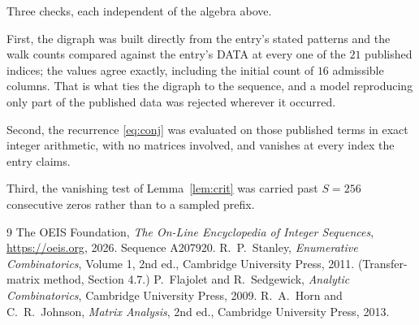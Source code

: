 \documentclass[11pt,a4paper]{article}
\theoremstyle{plain}
\theoremstyle{definition}
\begin{document}
Three checks, each independent of the algebra above.

First, the digraph was built directly from the entry's stated patterns and the walk counts
compared against the entry's DATA at every one of the $21$ published indices; the
values agree exactly, including the initial count of $16$ admissible columns. That is
what ties the digraph to the sequence, and a model reproducing only part of the published
data was rejected wherever it occurred.

Second, the recurrence \eqref{eq:conj} was evaluated on those published terms in exact
integer arithmetic, with no matrices involved, and vanishes at every index the entry claims.

Third, the vanishing test of Lemma~\ref{lem:crit} was carried past $S=256$ consecutive
zeros rather than to a sampled prefix.

\begin{thebibliography}{9}
 The OEIS Foundation, \emph{The On-Line Encyclopedia of Integer
Sequences}, \url{https://oeis.org}, 2026. Sequence A207920.
 R.~P.~Stanley, \emph{Enumerative Combinatorics}, Volume 1, 2nd ed.,
Cambridge University Press, 2011. (Transfer-matrix method, Section 4.7.)
 P.~Flajolet and R.~Sedgewick, \emph{Analytic Combinatorics}, Cambridge
University Press, 2009.
 R.~A.~Horn and C.~R.~Johnson, \emph{Matrix Analysis}, 2nd ed., Cambridge
University Press, 2013.
\end{thebibliography}
\end{document}
